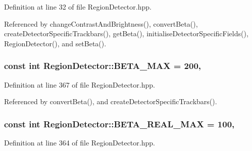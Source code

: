Definition at line 32 of file Region\-Detector.\-hpp.



Referenced by change\-Contrast\-And\-Brightness(), convert\-Beta(), create\-Detector\-Specific\-Trackbars(), get\-Beta(), initialise\-Detector\-Specific\-Fields(), Region\-Detector(), and set\-Beta().

\hypertarget{classmultiscale_1_1analysis_1_1RegionDetector_ad2c6485f637cae5abee0303b41df1480}{
\subsubsection[{B\-E\-T\-A\-\_\-\-M\-A\-X}]{\setlength{\rightskip}{0pt plus 5cm}const int Region\-Detector\-::\-B\-E\-T\-A\-\_\-\-M\-A\-X = 200\hspace{0.3cm}{\ttfamily [static]}, {\ttfamily [private]}}}\label{classmultiscale_1_1analysis_1_1RegionDetector_ad2c6485f637cae5abee0303b41df1480}


Definition at line 367 of file Region\-Detector.\-hpp.



Referenced by convert\-Beta(), and create\-Detector\-Specific\-Trackbars().

\hypertarget{classmultiscale_1_1analysis_1_1RegionDetector_a19e9e6c3ea18fe9a3dbf7a1a02652985}{
\subsubsection[{B\-E\-T\-A\-\_\-\-R\-E\-A\-L\-\_\-\-M\-A\-X}]{\setlength{\rightskip}{0pt plus 5cm}const int Region\-Detector\-::\-B\-E\-T\-A\-\_\-\-R\-E\-A\-L\-\_\-\-M\-A\-X = 100\hspace{0.3cm}{\ttfamily [static]}, {\ttfamily [private]}}}\label{classmultiscale_1_1analysis_1_1RegionDetector_a19e9e6c3ea18fe9a3dbf7a1a02652985}


Definition at line 364 of file Region\-Detector.\-hpp.



